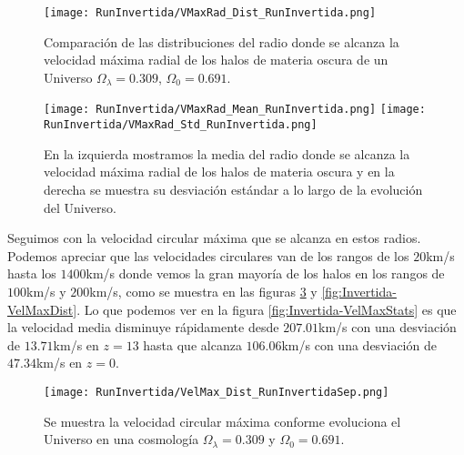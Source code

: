 \begin{figure}[H]
    \centering
    \texttt{[image: RunInvertida/VMaxRad\_Dist\_RunInvertida.png]}
    \caption[Distribución del radio donde se alcanza la velocidad máxima radial de un Universo $\Omega_\lambda = 0.309 $, $\Omega_0 = 0.691$]{\footnotesize Comparación de las distribuciones del radio donde se alcanza la velocidad máxima radial de los halos de materia oscura de un Universo $\Omega_\lambda = 0.309 $, $\Omega_0 = 0.691$.}
    \label{fig:Invertida-VMaxRadDist}
\end{figure}

\begin{figure}[H]
    \centering
    \texttt{[image: RunInvertida/VMaxRad\_Mean\_RunInvertida.png]}
    \texttt{[image: RunInvertida/VMaxRad\_Std\_RunInvertida.png]}
    \caption[Media y desviación estándar del Radio donde se alcanza la velocidad máxima radial de un Universo $\Omega_\lambda = 0.309 $, $\Omega_0 = 0.691$]{\footnotesize En la izquierda mostramos la media del radio donde se alcanza la velocidad máxima radial de los halos de materia oscura y en la derecha se muestra su desviación estándar a lo largo de la evolución del Universo.}
    \label{fig:Invertida-VMaxRadStats}
\end{figure}

Seguimos con la velocidad circular máxima que se alcanza en estos radios. Podemos apreciar que las velocidades circulares van de los rangos de los $20$km/s hasta los $1400$km/s donde vemos la gran mayoría de los halos en los rangos de $100$km/s y $200$km/s, como se muestra en las figuras \ref{fig:Invertida-VelMaxDistSep} y \ref{fig:Invertida-VelMaxDist}. Lo que podemos ver en la figura \ref{fig:Invertida-VelMaxStats} es que la velocidad  media disminuye rápidamente desde $207.01$km/s con una desviación de $13.71$km/s en $z=13$ hasta que alcanza $106.06$km/s con una desviación de $47.34$km/s en $z=0$. 

\begin{figure}[H]
    \centering
    \texttt{[image: RunInvertida/VelMax\_Dist\_RunInvertidaSep.png]}
    \caption[Velocidad circular máxima en la evolución de un Universo $\Omega_\lambda = 0.309 $, $\Omega_0 = 0.691$]{\footnotesize Se muestra la velocidad circular máxima conforme evoluciona el Universo en una cosmología $\Omega_\lambda = 0.309 $ y $\Omega_0 = 0.691$.}
    \label{fig:Invertida-VelMaxDistSep}
\end{figure}

